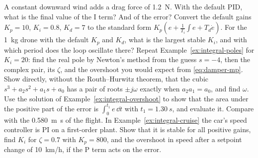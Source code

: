 \begin{exercises}
\exercise[1] A constant downward wind adds a drag force of \SI{1.2}{N}. With the default PID, what is the final value of the I term? And of the error?
\exercise[1] Convert the default gains $K_p = 10$, $K_i = 0.8$, $K_d = 7$ to the standard form $K_p(e + \tfrac1{T_i}\int e + T_d\dot e)$.
\exercise[1] For the \SI{1}{kg} drone with the default $K_p$ and $K_d$, what is the largest stable $K_i$, and with which period does the loop oscillate there?
\exercise[2] Repeat Example~\ref{ex:integral-poles} for $K_i = 20$: find the real pole by Newton's method from the guess $s = -4$, then the complex pair, its $\zeta$, and the overshoot you would expect from \cref{eq:damper-mp}.
\exercise[2] Show directly, without the Routh–Hurwitz theorem, that the cubic $s^3 + a_2 s^2 + a_1 s + a_0$ has a pair of roots $\pm j\omega$ exactly when $a_2 a_1 = a_0$, and find $\omega$.
\exercise[2] Use the solution of Example~\ref{ex:integral-overshoot} to show that the area under the positive part of the error is $\int_0^{t_1} e\,\dd t$ with $t_1 = \SI{1.30}{s}$, and evaluate it. Compare with the \SI{0.580}{m.s} of the flight.
\exercise[2] In Example~\ref{ex:integral-cruise} the car's speed controller is PI on a first-order plant. Show that it is stable for all positive gains, find $K_i$ for $\zeta = 0.7$ with $K_p = 800$, and the overshoot in speed after a setpoint change of \SI{10}{km/h}, if the P term acts on the error.

\end{exercises}
